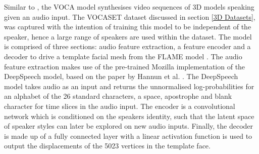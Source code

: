 \documentclass[12pt]{report}
\begin{document}
Similar to \cite{Tzirakis2019}, the VOCA model \cite{Cudeiro2019} synthesises video sequences of 3D models speaking given an audio input.
The VOCASET dataset discussed in section \ref{3D Datasets}, was captured with the intention of training this model to be independent of the speaker, hence a large range of speakers are used within the dataset.
The model is comprised of three sections: audio feature extraction, a feature encoder and a decoder to drive a template facial mesh from the FLAME model \cite{Li2017}.
The audio feature extraction makes use of the pre-trained Mozilla implementation of the DeepSpeech model, based on the paper by Hannun et al. \cite{Hannun2014}.
The DeepSpeech model takes audio as an input and returns the unnormalised log-probabilities for an alphabet of the 26 standard characters, a space, apostrophe and blank character for time slices in the audio input.
The encoder is a convolutional network which is conditioned on the speakers identity, such that the latent space of speaker styles can later be explored on new audio inputs.
Finally, the decoder is made up of a fully connected layer with a linear activation function is used to output the displacements of the 5023 vertices in the template face.



\end{document}
